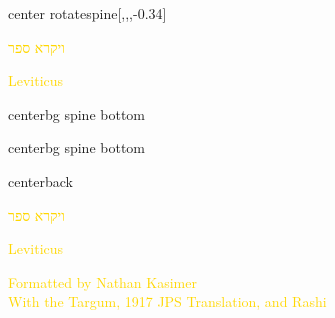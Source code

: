 \documentclass[
coverheight=9.93in,%
coverwidth=7.565in,%
spinewidth=.688in,
bleedwidth=.75in,
marklength=0in,
12pt,
pagecolor=darkblue,
]{bookcover}
\newcommand{\hebtext}[1]{
\begin{hebrew}
	#1
\end{hebrew}
}
\begin{document}
	\begin{bookcover}
	\begin{bookcoverelement}{center rotate}{spine}[,,,-0.34\coverheight]
		\LARGE\textcolor{gold}{\hebtext{ויקרא ספר} \space Leviticus }
	\end{bookcoverelement}
	\begin{bookcoverelement}{center}{bg spine bottom}
		\raisebox{\bleedwidth+2\baselineskip}{\textcolor{gold}{Kasimer}}
	\end{bookcoverelement}
	\begin{bookcoverelement}{center}{bg spine bottom}
		\raisebox{\bleedwidth}{\textcolor{gold}{Edition}}
	\end{bookcoverelement}

	\begin{bookcoverelement}{center}{back}
		\begin{Huge}
			\textcolor{gold}{\hebtext{ויקרא ספר}}
			
			\textcolor{gold}{Leviticus}
	
		\end{Huge}
		\vspace{2\baselineskip}
		\begin{large}
			\textcolor{gold}{Formatted by Nathan Kasimer\\With the Targum, 1917 JPS Translation, and Rashi}
		\end{large}
	\end{bookcoverelement}
	\end{bookcover}
	
\end{document}
